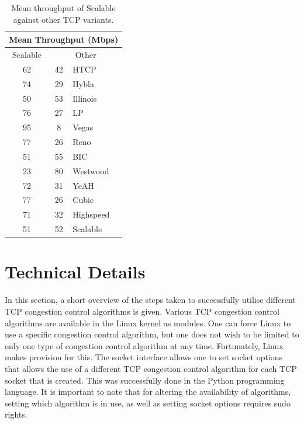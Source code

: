 \documentclass[11pt,a4paper,twocolumn]{article}
\begin{document}
\begin{table}[h!]
	\begin{center}
		\begin{tabular}{| c | c | l |}
    			\hline
			\multicolumn{3}{|c|}{Mean Throughput (Mbps)} \\
    			\hline
    			Scalable &  \multicolumn{2}{|c|}{Other}  \\
			\hline
    			62 & 42 & HTCP \\
			\hline
    			74 & 29 & Hybla \\
			\hline
    			50 & 53 & Illinois \\
			\hline
    			76 & 27 & LP \\
			\hline
    			95 & 8 & Vegas \\
			\hline
    			77 & 26 & Reno \\
			\hline
    			51 & 55 & BIC \\
			\hline
    			23 & 80 & Westwood \\
			\hline
    			72 & 31 & YeAH \\
			\hline
    			77 & 26 & Cubic \\
			\hline
    			71 & 32 & Highspeed \\
			\hline
    			51 & 52 & Scalable \\
    			\hline
    		\end{tabular}
  	\end{center}
  	\caption{Mean throughput of Scalable against other TCP variants.}
	\label{table:scalable}
\end{table}

\section{Technical Details}
\label{sec:diff}
In this section, a short overview of the steps taken to successfully utilise different TCP congestion control algorithms is given.
Various TCP congestion control algorithms are available in the Linux kernel as modules.
One can force Linux to use a specific congestion control algorithm, but one does not wish to be limited to only one type of congestion control algorithm at any time.
Fortunately, Linux makes provision for this.
The socket interface allows one to set socket options that allows the use of a different TCP congestion control algorithm for each TCP socket that is created.
This was successfully done in the Python programming language.
It is important to note that for altering the availability of algorithms, setting which algorithm is in use, as well as setting socket options requires
sudo rights.
\end{document}
